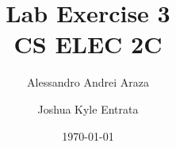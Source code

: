 

\title{{\Huge Lab Exercise 3}\\{\small CS ELEC 2C}}
\author{Alessandro Andrei Araza \and Joshua Kyle Entrata}
\date{\today}



    \maketitle

    \begin{abstract}
    \end{abstract}

    \begin{multicols}{2}
        \raggedcolumns
        
        
        
        
        
    \end{multicols}

    \newpage
    


